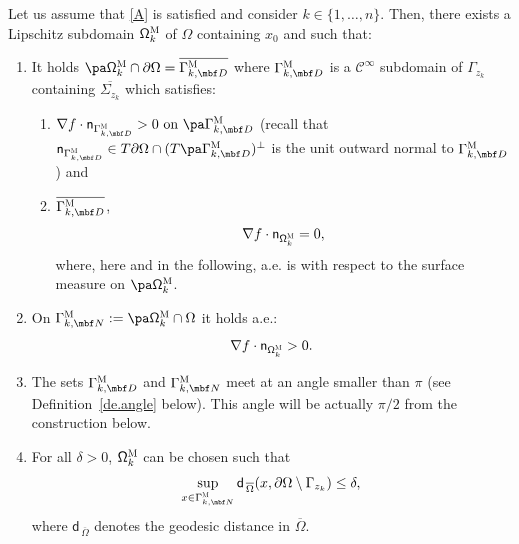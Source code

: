 \begin{proposition}\label{pr.omegakpoint}
Let us assume that \ref{A} is satisfied and
consider $k\in \{1,\ldots,n\}$. Then, there exists a Lipschitz
subdomain $\mathsf \Omega_k^{\textsc{M}}$ of $\Omega$ containing
$x_0$ and such that:
\begin{enumerate}
\item\label{pr.omegakpoint1}
It holds $\pa \mathsf \Omega_k^{\textsc{M}} \cap \partial \Omega = \overline{\Gamma_{k,\mbf D}^{\textsc{M}}}$ where $\Gamma_{k,\mbf D}^{\textsc{M}}$ is a $\mathcal C^\infty$ subdomain of $\Gamma_{z_k}$ containing $\overline{\Sigma_{z_k}}$ which satisfies:
\begin{enumerate}
\item\label{pr.omegakpoint1a}
$\nabla f\cdot \mathsf n_{ \Gamma_{k,\mbf D}^{\textsc{M}} }>0 \text{ on } \pa \Gamma_{k,\mbf D}^{\textsc{M}}$ (recall that $ \mathsf n_{ \Gamma_{k,\mbf D}^{\textsc{M}} }\in T\partial \Omega\cap (T\pa \Gamma_{k,\mbf D}^{\textsc{M}})^\bot$ is the unit outward normal to $ \Gamma_{k,\mbf D}^{\textsc{M}}$) and
\item\label{pr.omegakpoint1b}
 $\overline{ \Gamma_{k,\mbf D}^{\textsc{M}}}$,
\[
\nabla f\cdot \mathsf n_{ \mathsf \Omega_k^{\textsc{M}}}=0,
\]
where, here and in the following, a.e. is with respect to the surface measure on $\pa \mathsf \Omega_k^{\textsc{M}}$.
\end{enumerate}

\item\label{pr.omegakpoint2}
On $\Gamma_{k,\mbf N}^{\textsc{M}}:=\pa \mathsf \Omega_k^{\textsc{M}} \cap \Omega$ it holds a.e.:
\[
\nabla f \cdot \mathsf n_{\mathsf \Omega_k^{\textsc{M}}} >0.
\]

\item\label{pr.omegakpoint3}
The sets $\Gamma_{k,\mbf D}^{\textsc{M}}$ and $\Gamma_{k,\mbf N}^{\textsc{M}}$ meet at an angle smaller than
$\pi$ (see Definition~\ref{de.angle} below). This angle will be actually $\pi/2$ from the construction below.

\item\label{pr.omegakpoint4}
For all $\delta>0$, $\mathsf \Omega_k^{\textsc{M}}$ can be chosen such that
\begin{equation}\label{eq.gamma2_close_to_Bzc}
\sup_{x\in \Gamma_{k,\mbf N}^{\textsc{M}}}\mathsf d_{\, \overline \Omega}(x, \partial \Omega \setminus \Gamma_{z_k})\le\delta,
\end{equation}
where $\mathsf d_{\, \overline \Omega}$ denotes the geodesic distance in $\overline \Omega$.
\end{enumerate}
\end{proposition}


